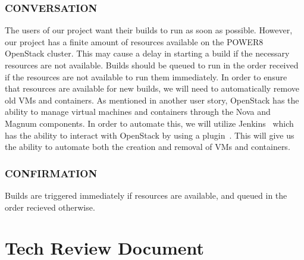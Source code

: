 \documentclass[10pt,letterpaper,onecolumn,draftclsnofoot]{IEEEtran}
\begin{document}
\subsubsection{CONVERSATION}
The users of our project want their builds to run as soon as possible.
However, our project has a finite amount of resources available on the POWER8 OpenStack cluster.
This may cause a delay in starting a build if the necessary resources are not available.
Builds should be queued to run in the order received if the resources are not available to run them immediately.
In order to ensure that resources are available for new builds, we will need to automatically remove old VMs and containers.
As mentioned in another user story, OpenStack has the ability to manage virtual machines and containers through the Nova and Magnum components.
In order to automate this, we will utilize Jenkins~\cite{jenkinsmain} which has the ability to interact with OpenStack by using a plugin~\cite{jcloudsplugin}.
This will give us the ability to automate both the creation and removal of VMs and containers.
\subsubsection{CONFIRMATION}
Builds are triggered immediately if resources are available, and queued in the order recieved otherwise.
\clearpage
\section{Tech Review Document}
\end{document}
